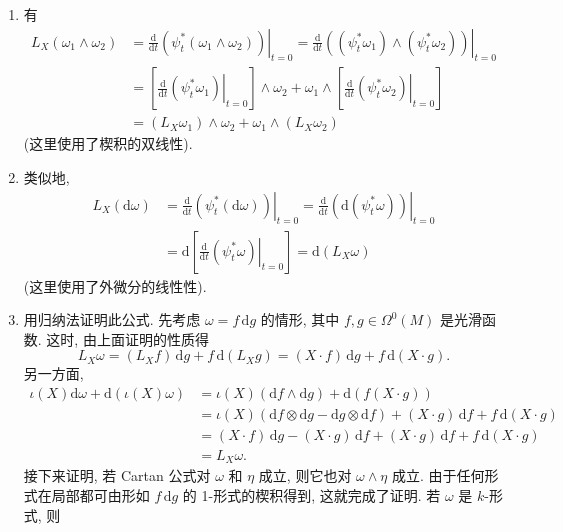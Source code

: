 \begin{description}[font=\normalfont,leftmargin=2em,labelwidth=1.5em]
\begin{enumerate}[label=(\alph*),ref=\alph*,leftmargin=*]
\item 有
\begin{align*}
  L_X(\omega_1\wedge\omega_2)
  &=\left.\frac{\mathrm{d}}{\mathrm{d}t}(\psi_t^*(\omega_1\wedge\omega_2))\right|_{t=0}
   =\left.\frac{\mathrm{d}}{\mathrm{d}t}((\psi_t^*\omega_1)\wedge(\psi_t^*\omega_2))\right|_{t=0}\\
  &=\left[\left.\frac{\mathrm{d}}{\mathrm{d}t}(\psi_t^*\omega_1)\right|_{t=0}\right]\wedge\omega_2
   +\omega_1\wedge\left[\left.\frac{\mathrm{d}}{\mathrm{d}t}(\psi_t^*\omega_2)\right|_{t=0}\right]\\
  &=(L_X\omega_1)\wedge\omega_2+\omega_1\wedge(L_X\omega_2)
\end{align*}
(这里使用了楔积的双线性).
\item 类似地,
\begin{align*}
  L_X(\mathrm{d}\omega)
  &=\left.\frac{\mathrm{d}}{\mathrm{d}t}(\psi_t^*(\mathrm{d}\omega))\right|_{t=0}
   =\left.\frac{\mathrm{d}}{\mathrm{d}t}(\mathrm{d}(\psi_t^*\omega))\right|_{t=0}\\
  &=\mathrm{d}\left[\left.\frac{\mathrm{d}}{\mathrm{d}t}(\psi_t^*\omega)\right|_{t=0}\right]
   =\mathrm{d}(L_X\omega)
\end{align*}
(这里使用了外微分的线性性).
\item 用归纳法证明此公式. 先考虑 $\omega=f\,\mathrm{d}g$ 的情形, 其中 $f,g\in\Omega^0(M)$ 是光滑函数. 这时, 由上面证明的性质得
\[
  L_X\omega=(L_X f)\,\mathrm{d}g+f\,\mathrm{d}(L_Xg)
  =(X\cdot f)\,\mathrm{d}g+f\,\mathrm{d}(X\cdot g).
\]
另一方面,
\begin{align*}
  \iota(X)\mathrm{d}\omega+\mathrm{d}(\iota(X)\omega)
  &=\iota(X)(\mathrm{d}f\wedge\mathrm{d}g)+\mathrm{d}(f(X\cdot g))\\
  &=\iota(X)(\mathrm{d}f\otimes\mathrm{d}g-\mathrm{d}g\otimes\mathrm{d}f)
    +(X\cdot g)\,\mathrm{d}f+f\,\mathrm{d}(X\cdot g)\\
  &=(X\cdot f)\,\mathrm{d}g-(X\cdot g)\,\mathrm{d}f+(X\cdot g)\,\mathrm{d}f+f\,\mathrm{d}(X\cdot g)\\
  &=L_X\omega.
\end{align*}
接下来证明, 若 Cartan 公式对 $\omega$ 和 $\eta$ 成立, 则它也对 $\omega\wedge\eta$ 成立. 由于任何形式在局部都可由形如 $f\,\mathrm{d}g$ 的 1-形式的楔积得到, 这就完成了证明. 若 $\omega$ 是 $k$-形式, 则
\begin{align*}

\end{align*}
\end{enumerate}
\end{description}
